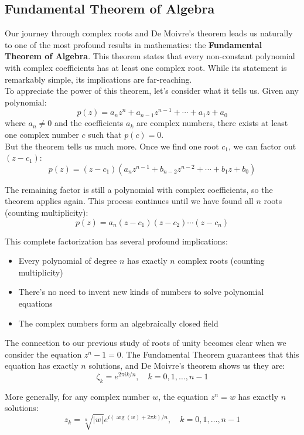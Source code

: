 \subsection*{Fundamental Theorem of Algebra} 

\noindent Our journey through complex roots and De Moivre's theorem leads us naturally to one of the most profound results in mathematics: the \textbf{Fundamental Theorem of Algebra}. This theorem states that every non-constant polynomial with complex coefficients has at least one complex root. While its statement is remarkably simple, its implications are far-reaching. \\

\noindent To appreciate the power of this theorem, let's consider what it tells us. Given any polynomial:
\[
p(z) = a_nz^n + a_{n-1}z^{n-1} + \cdots + a_1z + a_0
\]
where $a_n \neq 0$ and the coefficients $a_k$ are complex numbers, there exists at least one complex number $c$ such that $p(c) = 0$. \\

\noindent But the theorem tells us much more. Once we find one root $c_1$, we can factor out $(z-c_1)$:
\[
p(z) = (z-c_1)(a_nz^{n-1} + b_{n-2}z^{n-2} + \cdots + b_1z + b_0)
\]

\noindent The remaining factor is still a polynomial with complex coefficients, so the theorem applies again. This process continues until we have found all $n$ roots (counting multiplicity):
\[
p(z) = a_n(z-c_1)(z-c_2)\cdots(z-c_n)
\]

\noindent This complete factorization has several profound implications:
\begin{itemize}
   \item Every polynomial of degree $n$ has exactly $n$ complex roots (counting multiplicity)
   \item There's no need to invent new kinds of numbers to solve polynomial equations
   \item The complex numbers form an algebraically closed field
\end{itemize}

\noindent The connection to our previous study of roots of unity becomes clear when we consider the equation $z^n - 1 = 0$. The Fundamental Theorem guarantees that this equation has exactly $n$ solutions, and De Moivre's theorem shows us they are:
\[
\zeta_k = e^{2\pi i k/n}, \quad k = 0,1,\ldots,n-1
\]

\noindent More generally, for any complex number $w$, the equation $z^n = w$ has exactly $n$ solutions:
\[
z_k = \sqrt[n]{|w|}e^{i(\arg(w) + 2\pi k)/n}, \quad k = 0,1,\ldots,n-1
\]

